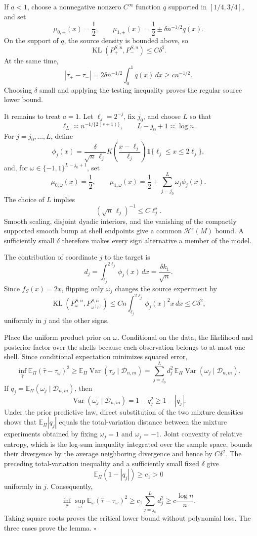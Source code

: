 If \(a<1\), choose a nonnegative nonzero \(C^\infty\) function \(q\) supported in \([1/4,3/4]\), and set
\[
\mu_{0,\pm}(x)=\frac12,
\qquad
\mu_{1,\pm}(x)=\frac12\pm\delta n^{-1/2}q(x).
\]
On the support of \(q\), the source density is bounded above, so
\[
\operatorname{KL}(P_+^{S,n},P_-^{S,n})\le C\delta^2.
\]
At the same time,
\[
|\tau_+-\tau_-|
=2\delta n^{-1/2}\int_0^1q(x)\,dx
\ge c n^{-1/2}.
\]
Choosing \(\delta\) small and applying the testing inequality proves the regular source lower bound.

It remains to treat \(a=1\). Let \(\ell_j=2^{-j}\), fix \(j_0\), and choose \(L\) so that
\[
\ell_L\asymp n^{-1/\{2(s+1)\}},
\qquad
L-j_0+1\asymp\log n.
\]
For \(j=j_0,\ldots,L\), define
\[
\phi_j(x)=\frac{\delta}{\sqrt n\,\ell_j}
K\!\left(\frac{x-\ell_j}{\ell_j}\right)
\mathbf 1\{\ell_j\le x\le2\ell_j\},
\]
and, for \(\omega\in\{-1,1\}^{L-j_0+1}\), set
\[
\mu_{0,\omega}(x)=\frac12,
\qquad
\mu_{1,\omega}(x)=\frac12+\sum_{j=j_0}^L\omega_j\phi_j(x).
\]
The choice of \(L\) implies
\[
(\sqrt n\,\ell_j)^{-1}\le C\ell_j^s.
\]
Smooth scaling, disjoint dyadic interiors, and the vanishing of the compactly supported smooth bump at shell endpoints give a common \(\mathcal H^s(M)\) bound. A sufficiently small \(\delta\) therefore makes every sign alternative a member of the model.

The contribution of coordinate \(j\) to the target is
\[
d_j=\int_{\ell_j}^{2\ell_j}\phi_j(x)\,dx
=\frac{\delta k_1}{\sqrt n}.
\]
Since \(f_S(x)=2x\), flipping only \(\omega_j\) changes the source experiment by
\[
\operatorname{KL}(P_\omega^{S,n},P_{\omega^{(j)}}^{S,n})
\le Cn\int_{\ell_j}^{2\ell_j}\phi_j(x)^2x\,dx
\le C\delta^2,
\]
uniformly in \(j\) and the other signs.

Place the uniform product prior on \(\omega\). Conditional on the data, the likelihood and posterior factor over the shells because each observation belongs to at most one shell. Since conditional expectation minimizes squared error,
\[
\inf_{\widehat\tau}\mathbb E_\Pi(\widehat\tau-\tau_\omega)^2
\ge
\mathbb E_\Pi\operatorname{Var}(\tau_\omega\mid\mathcal D_{n,m})
=\sum_{j=j_0}^Ld_j^2\,
\mathbb E_\Pi\operatorname{Var}(\omega_j\mid\mathcal D_{n,m}).
\]
If \(q_j=\mathbb E_\Pi(\omega_j\mid\mathcal D_{n,m})\), then
\[
\operatorname{Var}(\omega_j\mid\mathcal D_{n,m})=1-q_j^2\ge1-|q_j|.
\]
Under the prior predictive law, direct substitution of the two mixture densities shows that \(\mathbb E_\Pi|q_j|\) equals the total-variation distance between the mixture experiments obtained by fixing \(\omega_j=1\) and \(\omega_j=-1\). Joint convexity of relative entropy, which is the log-sum inequality integrated over the sample space, bounds their divergence by the average neighboring divergence and hence by \(C\delta^2\). The preceding total-variation inequality and a sufficiently small fixed \(\delta\) give
\[
\mathbb E_\Pi(1-|q_j|)\ge c_1>0
\]
uniformly in \(j\). Consequently,
\[
\inf_{\widehat\tau}\sup_\omega
\mathbb E_\omega(\widehat\tau-\tau_\omega)^2
\ge c_1\sum_{j=j_0}^Ld_j^2
\ge c\frac{\log n}{n}.
\]
Taking square roots proves the critical lower bound without polynomial loss. The three cases prove the lemma. \(\square\)
